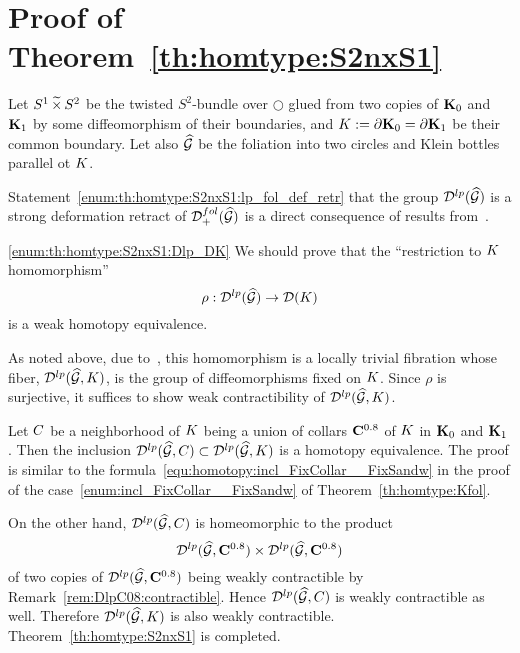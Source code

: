 \section{Proof of Theorem~\ref{th:homtype:S2nxS1}}\label{sect:proof:th:homtype:S2nxS1}
Let $S^1\,\widetilde{\times}\,S^2$ be the twisted $S^2$-bundle over $\Circle$ glued from two copies of $\mathbf{K}_0$ and $\mathbf{K}_1$ by some diffeomorphism of their boundaries, and $K:=\partial\mathbf{K}_0=\partial\mathbf{K}_1$ be their common boundary.
Let also $\widehat{\mathcal{G}}$ be the foliation into two circles and Klein bottles parallel ot $K$.


Statement~\ref{enum:th:homtype:S2nxS1:lp_fol_def_retr} that the group $\mathcal{D}^{lp}(\widehat{\mathcal{G}})$ is a strong deformation retract of $\mathcal{D}^{fol}_{+}(\widehat{\mathcal{G}})$ is a direct consequence of results from~\cite{Maksymenko:lens:2023}.

\ref{enum:th:homtype:S2nxS1:Dlp_DK}
We should prove that the ``restriction to $K$ homomorphism'' 
\[
    \rho:\mathcal{D}^{lp}(\widehat{\mathcal{G}}) \to \mathcal{D}(K)
\]
is a weak homotopy equivalence.

As noted above, due to~\cite{Cerf:BSMF:1961, Palais:CMH:1960, Lima:CMH:1964}, this homomorphism is a locally trivial fibration whose fiber, $\mathcal{D}^{lp}(\widehat{\mathcal{G}},K)$, is the group of diffeomorphisms fixed on $K$.
Since $\rho$ is surjective, it suffices to show weak contractibility of $\mathcal{D}^{lp}(\widehat{\mathcal{G}},K)$.

Let $C$ be a neighborhood of $K$ being a union of collars $\mathbf{C}^{0.8}$ of $K$ in $\mathbf{K}_0$ and $\mathbf{K}_1$.
Then the inclusion $\mathcal{D}^{lp}(\widehat{\mathcal{G}},C) \subset \mathcal{D}^{lp}(\widehat{\mathcal{G}},K)$ is a homotopy equivalence.
The proof is similar to the formula~\eqref{equ:homotopy:incl_FixCollar__FixSandw} in the proof of the case~\ref{enum:incl_FixCollar__FixSandw} of Theorem~\ref{th:homtype:Kfol}.

On the other hand, $\mathcal{D}^{lp}(\widehat{\mathcal{G}},C)$ is homeomorphic to the product 
\[ 
    \mathcal{D}^{lp}(\widehat{\mathcal{G}},\mathbf{C}^{0.8})\times\mathcal{D}^{lp}(\widehat{\mathcal{G}},\mathbf{C}^{0.8})
\]
of two copies of $\mathcal{D}^{lp}(\widehat{\mathcal{G}},\mathbf{C}^{0.8})$ being weakly contractible by Remark~\ref{rem:DlpC08:contractible}.
Hence $\mathcal{D}^{lp}(\widehat{\mathcal{G}},C)$ is weakly contractible as well.
Therefore $\mathcal{D}^{lp}(\widehat{\mathcal{G}},K)$ is also weakly contractible.
Theorem~\ref{th:homtype:S2nxS1} is completed.

